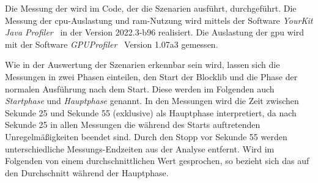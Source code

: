 Die Messung der \si{\fps} wird im Code, der die Szenarien ausführt, durchgeführt. Die Messung der \ac{cpu}-Auslastung und \ac{ram}-Nutzung wird mittels der Software \emph{YourKit Java Profiler}~\cite{YourKitGmbH} in der Version 2022.3-b96 realisiert. Die Auslastung der \ac{gpu} wird mit der Software \emph{GPUProfiler}~\cite{Main2021} Version 1.07a3 gemessen. 

Wie in der Auswertung der Szenarien erkennbar sein wird, lassen sich die Messungen in zwei Phasen einteilen, den Start der Blocklib und die Phase der normalen Ausführung nach dem Start. Diese werden im Folgenden auch \emph{Startphase} und \emph{Hauptphase} genannt. In den Messungen wird die Zeit zwischen Sekunde 25 und Sekunde 55 (exklusive) als Hauptphase interpretiert, da nach Sekunde 25 in allen Messungen die während des Starts auftretenden Unregelmäßigkeiten beendet sind. Durch den Stopp vor Sekunde 55 werden unterschiedliche Messungs-Endzeiten aus der Analyse entfernt. Wird im Folgenden von einem durchschnittlichen Wert gesprochen, so bezieht sich das auf den Durchschnitt während der Hauptphase.